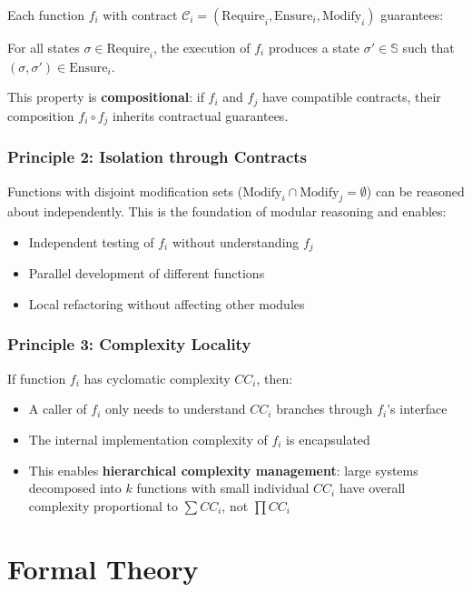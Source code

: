 \documentclass[a4paper,12pt]{article}
\theoremstyle{definition}
\begin{document}
Each function $f_i$ with contract $\mathcal{C}_i = (\mathrm{Require}_i, \mathrm{Ensure}_i, \mathrm{Modify}_i)$ guarantees:

For all states $\sigma \in \mathrm{Require}_i$, the execution of $f_i$ produces a state $\sigma' \in \mathbb{S}$ such that $(\sigma, \sigma') \in \mathrm{Ensure}_i$.

This property is \textbf{compositional}: if $f_i$ and $f_j$ have compatible contracts, their composition $f_i \circ f_j$ inherits contractual guarantees.

\subsubsection{Principle 2: Isolation through Contracts}

Functions with disjoint modification sets ($\mathrm{Modify}_i \cap \mathrm{Modify}_j = \emptyset$) can be reasoned about independently. This is the foundation of modular reasoning and enables:

\begin{itemize}
	\item Independent testing of $f_i$ without understanding $f_j$
	\item Parallel development of different functions
	\item Local refactoring without affecting other modules
\end{itemize}

\subsubsection{Principle 3: Complexity Locality}

If function $f_i$ has cyclomatic complexity $CC_i$, then:

\begin{itemize}
	\item A caller of $f_i$ only needs to understand $CC_i$ branches through $f_i$'s interface
	\item The internal implementation complexity of $f_i$ is encapsulated
	\item This enables \textbf{hierarchical complexity management}: large systems decomposed into $k$ functions with small individual $CC_i$ have overall complexity proportional to $\sum CC_i$, not $\prod CC_i$
\end{itemize}

\section{Formal Theory}
\end{document}
